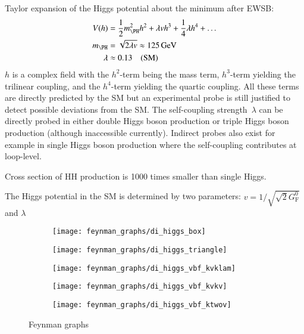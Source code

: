 Taylor expansion of the Higgs potential about the minimum after EWSB:
\begin{align*}
  V(h) &= \frac{1}{2} m_{\PH}^2 h^2 + \lambda v h^3 + \frac{1}{4} \lambda h^4 + \dots \\
  m_{\PH} &= \sqrt{2 \lambda v} \approx \SI{125}{\GeV} \\
  \lambda &\approx 0.13 \quad \text{(SM)}
\end{align*}
$h$ is a complex field with the $h^2$-term being the mass term,
$h^3$-term yielding the trilinear coupling, and the $h^4$-term
yielding the quartic coupling. All these terms are directly predicted
by the SM but an experimental probe is still justified to detect
possible deviations from the SM. The self-coupling strength~$\lambda$
can be directly probed in either double Higgs boson production or
triple Higgs boson production (although inaccessible
currently). Indirect probes also exist for example in single Higgs
boson production where the self-coupling contributes at loop-level.

Cross section of HH production is 1000 times smaller than single
Higgs. 

The Higgs potential in the SM is determined by two parameters:
$v = 1 / \sqrt{\sqrt{2} G_{\text{F}}^0}$ and $\lambda$

\begin{figure}[htbp]
  \centering

  \begin{subfigure}{0.49\textwidth}
    \centering
    \texttt{[image: feynman\_graphs/di\_higgs\_box]}
    \subcaption{}
  \end{subfigure}\hfill%
  \begin{subfigure}{0.49\textwidth}
    \centering
    \texttt{[image: feynman\_graphs/di\_higgs\_triangle]}
    \subcaption{}
  \end{subfigure}

  \vspace*{1em}

  \begin{subfigure}{0.33\textwidth}
    \centering
    \texttt{[image: feynman\_graphs/di\_higgs\_vbf\_kvklam]}
    \subcaption{}
  \end{subfigure}\hfill%
  \begin{subfigure}{0.33\textwidth}
    \centering
    \texttt{[image: feynman\_graphs/di\_higgs\_vbf\_kvkv]}
    \subcaption{}
  \end{subfigure}\hfill%
  \begin{subfigure}{0.33\textwidth}
    \centering
    \texttt{[image: feynman\_graphs/di\_higgs\_vbf\_ktwov]}
    \subcaption{}
  \end{subfigure}

  \caption{Feynman graphs}
  \label{fig:hh_feynmans}
\end{figure}

